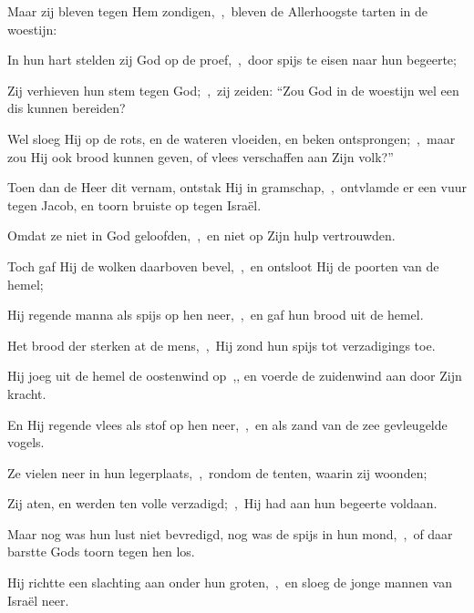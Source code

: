 \documentclass[12pt,twoside,a5paper]{article}
\begin{document}

\begin{halfparskip}
  Maar zij bleven tegen Hem zondigen,~\sep\ bleven de Allerhoogste tarten in de woestijn:

  In hun hart stelden zij God op de proef,~\sep\ door spijs te eisen naar hun begeerte;

  Zij verhieven hun stem tegen God;~\sep\ zij zeiden: ``Zou God in de woestijn wel een dis kunnen bereiden?

  Wel sloeg Hij op de rots, en de wateren vloeiden, en beken ontsprongen;~\sep\ maar zou Hij ook brood kunnen geven, of vlees verschaffen aan Zijn volk?''

  Toen dan de Heer dit vernam, ontstak Hij in gramschap,~\sep\ ontvlamde er een vuur tegen Jacob, en toorn bruiste op tegen Israël.

  Omdat ze niet in God geloofden,~\sep\ en niet op Zijn hulp vertrouwden.

  Toch gaf Hij de wolken daarboven bevel,~\sep\ en ontsloot Hij de poorten van de hemel;

  Hij regende manna als spijs op hen neer,~\sep\ en gaf hun brood uit de hemel.

  Het brood der sterken at de mens,~\sep\ Hij zond hun spijs tot verzadigings toe.

  Hij joeg uit de hemel de oostenwind op~\sep , en voerde de zuidenwind aan door Zijn kracht.

  En Hij regende vlees als stof op hen neer,~\sep\ en als zand van de zee gevleugelde vogels.

  Ze vielen neer in hun legerplaats,~\sep\ rondom de tenten, waarin zij woonden;

  Zij aten, en werden ten volle verzadigd;~\sep\ Hij had aan hun begeerte voldaan.

  Maar nog was hun lust niet bevredigd, nog was de spijs in hun mond,~\sep\ of daar barstte Gods toorn tegen hen los.

  Hij richtte een slachting aan onder hun groten,~\sep\ en sloeg de jonge mannen van Israël neer.
\end{halfparskip}

\end{document}
